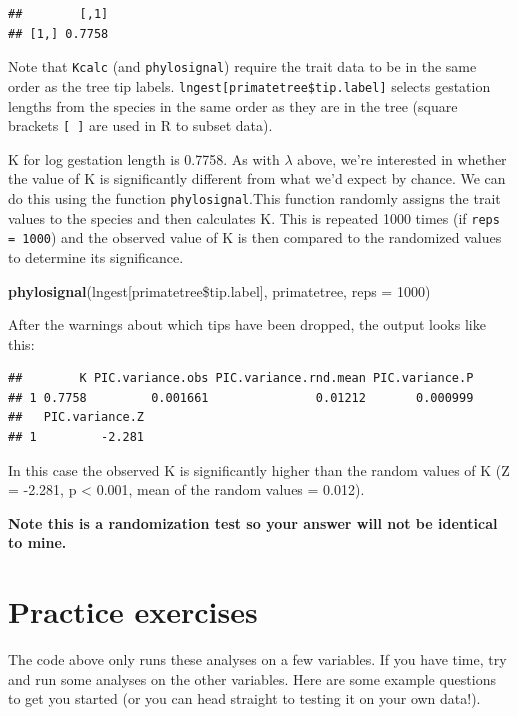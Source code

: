 \documentclass[12pt]{article}
\newcommand{\KeywordTok}[1]{\textcolor[rgb]{0.13,0.29,0.53}{\textbf{{#1}}}}
\newcommand{\DataTypeTok}[1]{\textcolor[rgb]{0.13,0.29,0.53}{{#1}}}
\newcommand{\DecValTok}[1]{\textcolor[rgb]{0.00,0.00,0.81}{{#1}}}
\newcommand{\NormalTok}[1]{{#1}}
\begin{document}
\begin{verbatim}
##        [,1]
## [1,] 0.7758
\end{verbatim}

Note that \texttt{Kcalc} (and \texttt{phylosignal}) require the trait data to be in the same order as the tree tip labels. \texttt{lngest[primatetree\$tip.label]} selects gestation lengths from the species in the same order as they are in the tree (square brackets \texttt{[ ]} are used in R to subset data).

K for log gestation length is 0.7758. As with $\lambda$ above, we’re interested in whether the value of K is significantly different from what we’d expect by chance. We can do this using the function \texttt{phylosignal}.This function randomly assigns the trait values to the species and then calculates K. This is repeated 1000 times (if \texttt{reps = 1000}) and the observed value of K is then compared to the randomized values to determine its significance.

\begin{snugshade}
\begin{Highlighting}[]
\KeywordTok{phylosignal}\NormalTok{(lngest[primatetree\$tip.label], primatetree, }\DataTypeTok{reps =} \DecValTok{1000}\NormalTok{)}
\end{Highlighting}
\end{snugshade}

After the warnings about which tips have been dropped, the output looks like this:

\begin{verbatim}
##        K PIC.variance.obs PIC.variance.rnd.mean PIC.variance.P
## 1 0.7758         0.001661               0.01212       0.000999
##   PIC.variance.Z
## 1         -2.281
\end{verbatim}

In this case the observed K is significantly higher than the random values of K (Z = -2.281, p < 0.001, mean of the random values = 0.012). 

\textbf{Note this is a randomization test so your answer will not be identical to mine.}

\section{Practice exercises}
The code above only runs these analyses on a few variables. If you have time, try and run some analyses on the other variables. Here are some example questions to get you started (or you can head straight to testing it on your own data!).
\end{document}
